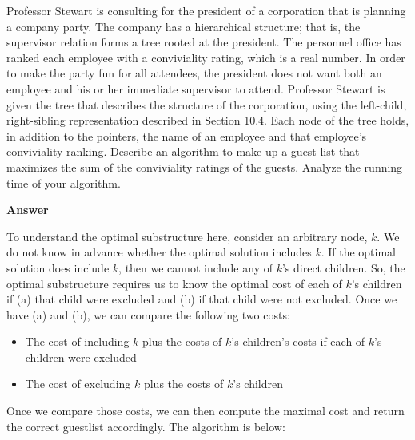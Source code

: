 \documentclass[]{book}
\theoremstyle{definition}
\begin{document}
Professor Stewart is consulting for the president of a corporation that is planning
a company party. The company has a hierarchical structure; that is, the supervisor
relation forms a tree rooted at the president. The personnel office has ranked each
employee with a conviviality rating, which is a real number. In order to make the
party fun for all attendees, the president does not want both an employee and his
or her immediate supervisor to attend.
Professor Stewart is given the tree that describes the structure of the corporation,
using the left-child, right-sibling representation described in Section 10.4. Each
node of the tree holds, in addition to the pointers, the name of an employee and
that employee's conviviality ranking. Describe an algorithm to make up a guest
list that maximizes the sum of the conviviality ratings of the guests. Analyze the
running time of your algorithm.

\textbf{Answer}

To understand the optimal substructure here, consider an arbitrary node, $k$.
We do not know in advance whether the optimal solution includes $k$.
If the optimal solution does include $k$, then we cannot include
any of $k$'s direct children. So, the optimal substructure requires
us to know the optimal cost of each of $k$'s children if
(a) that child were excluded and (b) if that child were not excluded.
Once we have (a) and (b), we can compare the following two costs:
\begin{itemize}
    \item The cost of including $k$ plus the costs of $k$'s children's costs if each
          of $k$'s children were excluded
    \item The cost of excluding $k$ plus the costs of $k$'s children
\end{itemize}

Once we compare those costs, we can then compute the maximal cost and return
the correct guestlist accordingly. The algorithm is below:
\end{document}
